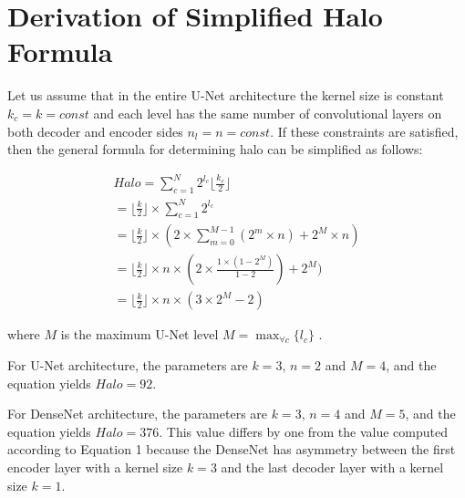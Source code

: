 \documentclass[twoside,11pt]{article}
\newif\ifcamera
\begin{document}
\ifcamera
\section{Disclaimer}

Commercial products are identified in this document in order to specify the experimental procedure adequately. Such identification is not intended to imply recommendation or endorsement by NIST, nor is it intended to imply that the products identified are necessarily the best available for the purpose. Analysis performed [in part] on the NIST Enki HPC cluster. Contribution of U.S. government not subject to copyright.
\fi

\clearpage

\appendix
\section{Derivation of Simplified Halo Formula}

Let us assume that in the entire U-Net architecture the kernel size is constant $k_{c} = k = const$ and each level has the same number of convolutional layers on both decoder and encoder sides $n_{l} = n = const$. If these constraints are satisfied, then the general formula for determining halo can be simplified as follows:

\begin{equation}
\begin{aligned}
Halo = \sum_{c=1}^{N} 2^{l_c} \lfloor \frac{k_c}{2} \rfloor \\
= \lfloor \frac{k}{2} \rfloor \times \sum_{c=1}^{N} 2^{l_c} \\
= \lfloor \frac{k}{2} \rfloor \times ( 2 \times \sum_{m=0}^{M-1} (2^{m} \times n) + 2^{M} \times n )  \\
= \lfloor \frac{k}{2} \rfloor \times n \times ( 2 \times \frac{1 \times (1 - 2^M) }{ 1- 2} ) + 2^{M} )  \\
= \lfloor \frac{k}{2} \rfloor \times n \times (3 \times 2^{M} - 2) 
\end{aligned}
\label{eq:halo2}
\end{equation}

where $M$ is the maximum U-Net level $M = \max_{\forall c}\{ l_{c} \}$ .

For U-Net architecture, the parameters are $k = 3$, $n=2$ and $M=4$, and the equation yields $Halo=92$.

For DenseNet architecture, the parameters are $k = 3$, $n=4$ and $M=5$, and the equation yields $Halo=376$. This value differs by one from the value computed according to Equation 1 because the DenseNet has asymmetry between the first encoder layer with a kernel size $k = 3$ and the last decoder layer with a kernel size $k = 1$.   
\end{document}

